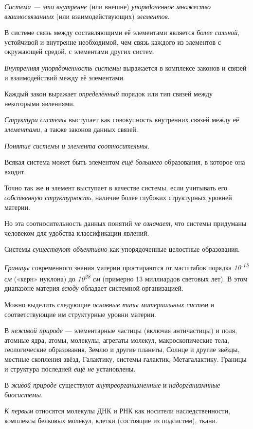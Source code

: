 \documentclass[a4paper,14pt,russian]{extreport}
\begin{document}
\emph{Система --- это внутренне} (или внешне) \emph{упорядоченное множество взаимосвязанных} (или взаимодействующих) \emph{элементов}.

В системе связь между составляющими её элементами является \emph{более сильной}, устойчивой и внутренне необходимой, чем связь каждого из элементов с окружающей средой, с элементами других систем.

\emph{Внутренняя упорядоченность системы} выражается в комплексе законов и связей и взаимодействий между её элементами.

Каждый закон выражает \emph{определённый} порядок или тип связей между некоторыми явлениями.

\emph{Структура системы} выступает как совокупность внутренних связей между её \emph{элементами}, а также законов данных связей.

\emph{Понятие системы и элемента соотносительны}.

Всякая система может быть элементом \emph{ещё большего} образования, в которое она входит.

Точно так же и элемент выступает в качестве системы, если учитывать его \emph{собственную структурность}, наличие более глубоких структурных уровней материи.

Но эта соотносительность данных понятий \emph{не означает}, что системы придуманы человеком для удобства классификации явлений.

Системы \emph{существуют объективно} как упорядоченные целостные образования.

\emph{Границы} современного знания материи простираются от масштабов порядка \emph{10\textsuperscript{-15} см} («керн» нуклона) до \emph{10\textsuperscript{28} см} (примерно 13 миллиардов световых лет). В этом диапазоне материя \emph{всюду} обладает системной организацией.

Можно выделить следующие \emph{основные типы материальных систем} и соответствующие им структурные уровни материи.

В \emph{неживой природе} --- элементарные частицы (включая античастицы) и поля, атомные ядра, атомы, молекулы, агрегаты молекул, макроскопические тела, геологические образования, Землю и другие планеты, Солнце и другие звёзды, местные скопления звёзд, Галактику, системы галактик, Метагалактику. Границы и структура последней \emph{ещё не} установлены.

В \emph{живой природе} существуют \emph{внутреорганизменные} и \emph{надорганизмнные биосистемы}.

\emph{К первым} относятся молекулы ДНК и РНК как носители наследственности, комплексы белковых молекул, клетки (состоящие из подсистем), ткани.
\end{document}
